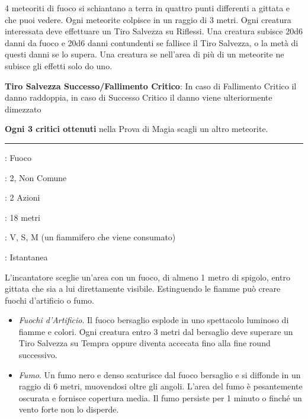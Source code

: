 \begin{multicols}{2}
4 meteoriti di fuoco si schiantano a terra in quattro punti differenti a gittata e che puoi vedere. Ogni meteorite colpisce in un raggio di 3 metri. Ogni creatura interessata deve effettuare un Tiro Salvezza su Riflessi. Una creatura subisce 20d6 danni da fuoco e 20d6 danni contundenti se fallisce il Tiro Salvezza, o la metà di
questi danni se lo supera. Una creatura se nell'area di più di un meteorite ne subisce gli effetti solo do uno.

\textbf{Tiro Salvezza Successo/Fallimento Critico}: In caso di Fallimento Critico il danno raddoppia, in caso di Successo Critico il danno viene ulteriormente dimezzato

\textbf{Ogni 3 critici ottenuti} nella Prova di Magia scagli un altro meteorite.

\smallskip\noindent\rule{\linewidth}{2pt} \hypertarget{Piroesperto}{}\smallskip{}
\noindent
\begin{description}[noitemsep, topsep=0pt, parsep=0pt, partopsep=0pt, leftmargin=0cm, labelwidth=2.8cm]
	\item[\textbf{Lista di Magia}]: Fuoco
	\item[\textbf{Livello}]: 2, Non Comune
	\item[\textbf{T. di Lancio}]: 2 Azioni
	\item[\textbf{Gittata}]: 18 metri
	\item[\textbf{Componenti}]: V, S, M (un fiammifero che viene consumato)
	\item[\textbf{Durata}]: Istantanea
\end{description}

L'incantatore sceglie un'area con un fuoco, di almeno 1 metro di spigolo, entro gittata che sia a lui direttamente visibile. Estinguendo le fiamme può creare fuochi d'artificio o fumo.

\begin{itemize}[leftmargin=*] \setlength{\itemsep}{0pt}
	\item \emph{Fuochi d'Artificio}. Il fuoco bersaglio esplode in uno spettacolo luminoso di fiamme e colori. Ogni creatura entro 3 metri dal bersaglio deve superare un Tiro Salvezza su Tempra oppure diventa accecata fino alla fine round successivo.
	\item \emph{Fumo}. Un fumo nero e denso scaturisce dal fuoco bersaglio e si diffonde in un raggio di 6 metri, muovendosi oltre gli angoli. L'area del fumo è pesantemente oscurata e fornisce copertura media. Il fumo persiste per 1 minuto o finché un vento forte non lo disperde.
\end{itemize}


\end{multicols}
